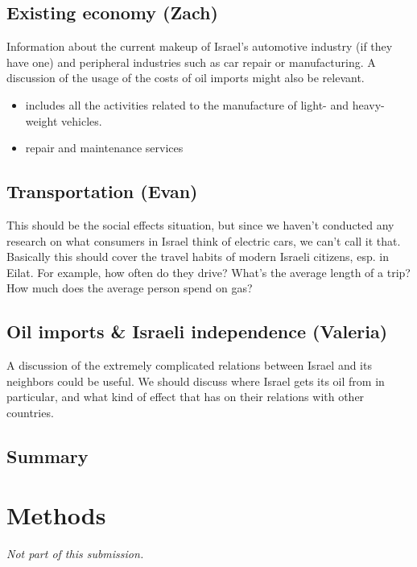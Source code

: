 \documentclass{article}                         %
\begin{document}
\subsection{Existing economy (Zach)}
Information about the current makeup of Israel's automotive industry (if they have one) and peripheral industries such as car repair or manufacturing. A discussion of the usage of the costs of oil imports might also be relevant.

\begin{itemize}
\item includes all the activities related to the manufacture of light- and heavy-weight vehicles.
\item repair and maintenance services
\end{itemize}

\cite{}

\subsection{Transportation (Evan)}
This should be the social effects situation, but since we haven't conducted any research on what consumers in Israel think of electric cars, we can't call it that. Basically this should cover the travel habits of modern Israeli citizens, esp. in Eilat. For example, how often do they drive? What's the average length of a trip? How much does the average person spend on gas?

\subsection{Oil imports \& Israeli independence (Valeria)}

A discussion of the extremely complicated relations between Israel and its neighbors could be useful. We should discuss where Israel gets its oil from in particular, and what kind of effect that has on their relations with other countries.

\subsection{Summary}

\newpage
\section{Methods}
\textit{Not part of this submission.}

\newpage


\end{document}
